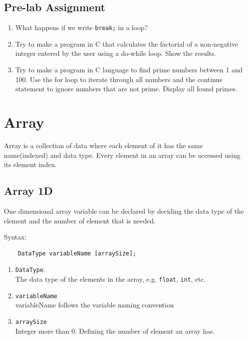 \subsection{Pre-lab Assignment}
\begin{enumerate}
	\item What happens if we write \verb|break;| in a loop?
	\item Try to make a program in C that calculates the factorial of a non-negative integer entered by the user using a do-while loop. Show the results.
	\item Try to make a program in C language to find prime numbers between 1 and 100. Use the for loop to iterate through all numbers and the continue statement to ignore numbers that are not prime. Display all found primes.
\end{enumerate}

\section{Array}
Array is a collection of data where each element of it has the same name(indexed) and data type. Every element in an array can be accessed using its element index.
\subsection{Array 1D}
One dimensional array variable can be declared by deciding the data type of the element and the number of element that is needed.

Syntax:
\begin{verbatim}
    DataType variableName [arraySize];
\end{verbatim}
\begin{enumerate}
	\item \verb*|DataType|.\\
	      The data type of the elements in the array, e.g. \verb|float|, \verb|int|, etc.
	\item \verb*|variableName|\\
	      variableName follows the variable naming convention

	\item \verb*|arraySize| \\
	      Integer more than 0. Defining the number of element an array has.
\end{enumerate}

